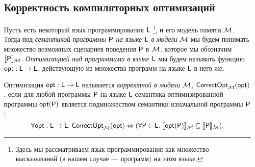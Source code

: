 \subsection{Корректность компиляторных оптимизаций}
Пусть есть некоторый язык программирования $\mathsf{L}$%
\footnote{Здесь мы рассматриваем язык программирования как множество высказываний
(в нашем случае --- программ) на этом языке.},
и его модель памяти $\mathcal{M}$.
Тогда под \emph{семантикой программы $\mathsf{P}$ на языке $\mathsf{L}$ в модели $\mathcal{M}$}
мы будем понимать множество возможных сценариев поведения $\mathsf{P}$ в $\mathcal{M}$,
которое мы обозначим $\llbracket \mathsf{P} \rrbracket_{\mathcal{M}}$.
\emph{Оптимизацией над программами в языке $\mathsf{L}$} мы будем называть функцию $\mathsf{opt} : \mathsf{L} \rightarrow \mathsf{L}$, действующую из
множества программ на языке $\mathsf{L}$ в него же.
\begin{definition}
  Оптимизация $\mathsf{opt} : \mathsf{L} \rightarrow \mathsf{L}$ называется \emph{корректной в модели $\mathcal{M}$},
  $\mathsf{CorrectOpt}_{\mathcal{M}}(\mathsf{opt})$, если для любой программы $\mathsf{P}$ на языке $\mathsf{L}$
  семантика оптимизированной программы $\mathsf{opt}(\mathsf{P})$ является подмножеством семантики изначальной программы $\mathsf{P}$:
  \[\forall \mathsf{opt} : \mathsf{L} \rightarrow \mathsf{L}. \; \mathsf{CorrectOpt}_{\mathcal{M}}(\mathsf{opt}) \Leftrightarrow (\forall \mathsf{P} \in \mathsf{L}. \; \llbracket \mathsf{opt}(\mathsf{P}) \rrbracket_{\mathcal{M}} \subseteq \llbracket \mathsf{P} \rrbracket_{\mathcal{M}}). \]
\end{definition}

